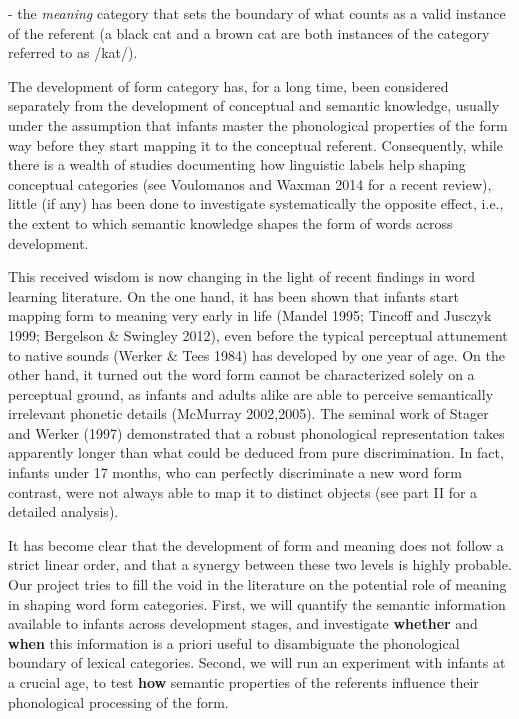 \documentclass[12pt]{article}
\begin{document}
- the \textit{meaning} category that sets the boundary of what counts as a valid instance of the referent (a black cat and a brown cat are both instances of the category referred to as /kat/).

The development of form category has, for a long time, been considered separately from the development of conceptual and semantic knowledge, usually under the assumption that infants master the phonological properties of the form way before they start mapping it to the conceptual referent.  Consequently, while there is a wealth of studies documenting how linguistic labels help shaping conceptual categories (see Voulomanos and Waxman 2014 for a recent review), little (if any) has been done to investigate systematically the opposite effect, i.e., the extent to which semantic knowledge shapes the form of words across development. 

This received wisdom is now changing in the light of recent findings in word learning literature. On the one hand, it has been shown that infants start mapping form to meaning very early in life (Mandel 1995; Tincoff and Jusczyk 1999; Bergelson \& Swingley 2012), even before the typical perceptual attunement to native sounds (Werker \& Tees 1984) has developed by one year of age.  On the other hand,  it turned out the word form cannot be characterized solely on a perceptual ground, as infants and adults alike are able to perceive semantically irrelevant phonetic details (McMurray 2002,2005).  The seminal work of Stager and Werker (1997) demonstrated that a robust phonological representation takes apparently longer than what could be deduced from pure discrimination. In fact, infants under 17 months, who can perfectly discriminate a new word form contrast, were not always able to map it to distinct objects (see part II for a detailed analysis). 

It has become clear that the development of form and meaning does not follow a strict linear order, and that a synergy between these two levels is highly probable. Our project tries to fill the void in the literature on the potential role of meaning in shaping word form categories. 
First, we will quantify the semantic information available to infants across development stages, and investigate \textbf{whether} and \textbf{when} this information is a priori useful to disambiguate the phonological boundary of lexical categories. Second, we will run an experiment with infants at a crucial age, to test \textbf{how} semantic properties of the referents influence their phonological processing of the form.
\end{document}
